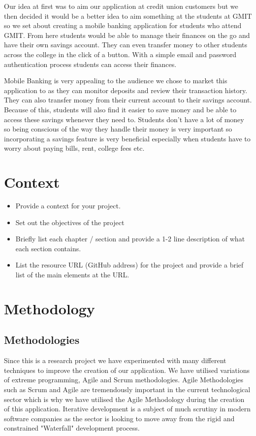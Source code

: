 Our idea at first was to aim our application at credit union customers but we then decided it would be a better idea to aim something at the students at GMIT so we set about creating a mobile banking application for students who attend GMIT. From here students would be able to manage their finances on the go and have their own savings account. They can even transfer money to other students across the college in the click of a button. With a simple email and password authentication process students can access their finances.

Mobile Banking is very appealing to the audience we chose to market this application to as they can monitor deposits and review their transaction history. They can also transfer money from their current account to their savings account. Because of this, students will also find it easier to save money and be able to access these savings whenever they need to. Students don’t have a lot of money so being conscious of the way they handle their money is very important so incorporating a savings feature is very beneficial especially when students have to worry about paying bills, rent, college fees etc.

	


\chapter{Context}
\begin{itemize}
\item Provide a context for your project.
\item Set out the objectives of the project
\item Briefly list each chapter / section and provide a 1-2 line description of what each section contains.
\item List the resource URL (GitHub address) for the project and provide a brief list of the main elements at the URL.
\end{itemize}



\chapter{Methodology}

\section{Methodologies}
  
  Since this is a research project we have experimented with many different techniques to improve the creation of our application. We have utilised variations of extreme programming, 
  Agile and Scrum methodologies. 
  Agile Methodologies such as Scrum and Agile are tremendously important in the current technological sector which is why we have utilised the Agile Methodology during the creation of this application\cite{agile}. 
  Iterative development is a subject of much scrutiny in modern software companies as the sector is looking to move away from the rigid and constrained "Waterfall" development process\cite{agilewaterfall}. 
  

